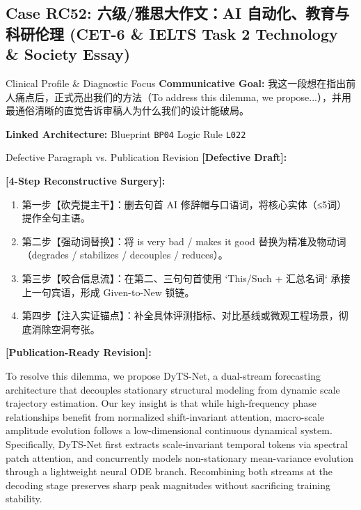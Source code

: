 \subsection{Case RC52: 六级/雅思大作文：AI 自动化、教育与科研伦理 (CET-6 \& IELTS Task 2 Technology \& Society Essay)}\label{case:RC52}
\begin{ConceptBox}{Clinical Profile \& Diagnostic Focus}
\textbf{Communicative Goal:} 我这一段想在指出前人痛点后，正式亮出我们的方法（To address this dilemma, we propose...），并用最通俗清晰的直觉告诉审稿人为什么我们的设计能破局。\par
\textbf{Linked Architecture:} Blueprint \texttt{BP04} \enspace\textbar\enspace Logic Rule \texttt{L022}
\end{ConceptBox}
\begin{ExampleBox}{Defective Paragraph vs. Publication Revision}
\textbf{\color{TargetHighlight}[Defective Draft]:}\par
{}\par\vspace{6pt}
\textbf{\color{AcadForest}[4-Step Reconstructive Surgery]:}
\begin{enumerate}[label=\textbf{\color{AcadNavy}Step \arabic*:}, leftmargin=2em]
  \item 第一步【砍壳提主干】：删去句首 AI 修辞帽与口语词，将核心实体（≤5词）提作全句主语。
  \item 第二步【强动词替换】：将 is very bad / makes it good 替换为精准及物动词（degrades / stabilizes / decouples / reduces）。
  \item 第三步【咬合信息流】：在第二、三句句首使用 `This/Such + 汇总名词` 承接上一句宾语，形成 Given-to-New 锁链。
  \item 第四步【注入实证锚点】：补全具体评测指标、对比基线或微观工程场景，彻底消除空洞夸张。
\end{enumerate}\vspace{4pt}
\textbf{\color{AcadNavy}[Publication-Ready Revision]:}\par
To resolve this dilemma, we propose DyTS-Net, a dual-stream forecasting architecture that decouples stationary structural modeling from dynamic scale trajectory estimation. Our key insight is that while high-frequency phase relationships benefit from normalized shift-invariant attention, macro-scale amplitude evolution follows a low-dimensional continuous dynamical system. Specifically, DyTS-Net first extracts scale-invariant temporal tokens via spectral patch attention, and concurrently models non-stationary mean-variance evolution through a lightweight neural ODE branch. Recombining both streams at the decoding stage preserves sharp peak magnitudes without sacrificing training stability.
\end{ExampleBox}
